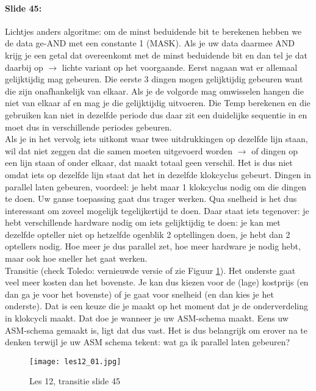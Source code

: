 \documentclass[10pt,a4paper]{book}
\begin{document}
\paragraph{Slide 45:} Lichtjes anders algoritme: om de minst beduidende bit te berekenen hebben we de data ge-AND met een constante 1 (MASK). Als je uw data daarmee AND krijg je een getal dat overeenkomt met de minst beduidende bit en dan tel je dat daarbij op $\rightarrow$ lichte variant op het voorgaande. Eerst nagaan wat er allemaal gelijktijdig mag gebeuren. Die eerste 3 dingen mogen gelijktijdig gebeuren want die zijn onafhankelijk van elkaar. Als je de volgorde mag omwisselen hangen die niet van elkaar af en mag je die gelijktijdig uitvoeren.  Die Temp berekenen en die gebruiken kan niet in dezelfde periode dus daar zit een duidelijke sequentie in en moet dus in verschillende periodes gebeuren.\\
Als je in het vervolg iets uitkomt waar twee uitdrukkingen op dezelfde lijn staan, wil dat niet zeggen dat die samen moeten uitgevoerd worden $\rightarrow$ of dingen op een lijn staan of onder elkaar, dat maakt totaal geen verschil. Het is dus niet omdat iets op dezelfde lijn staat dat het in dezelfde klokcyclus gebeurt. Dingen in parallel laten gebeuren, voordeel: je hebt maar 1 klokcyclus nodig om die dingen te doen. Uw ganse toepassing gaat dus trager werken. Qua snelheid is het dus interessant om zoveel mogelijk tegelijkertijd te doen. Daar staat iets tegenover: je hebt verschillende hardware nodig om iets gelijktijdig te doen: je kan met dezelfde opteller niet op hetzelfde ogenblik 2 optellingen doen, je hebt dan 2 optellers nodig. Hoe meer je dus parallel zet, hoe meer hardware je nodig hebt, maar ook hoe sneller het gaat werken.\\
Transitie (check Toledo: vernieuwde versie of zie Figuur \ref{les12_01}). Het onderste gaat veel meer kosten dan het bovenste. Je kan dus kiezen voor de (lage) kostprijs (en dan ga je voor het bovenste) of je gaat voor snelheid (en dan kies je het onderste). Dat is een keuze die je maakt op het moment dat je de onderverdeling in klokcycli maakt. Dat doe je wanneer je uw ASM-schema maakt. Eens uw ASM-schema gemaakt is, ligt dat dus vast. Het is dus belangrijk om erover na te denken terwijl je uw ASM schema tekent: wat ga ik parallel laten gebeuren?

\begin{figure}[ht!]
\centering
\texttt{[image: les12\_01.jpg]}
\caption{Les 12, transitie slide 45}
\label{les12_01}
\end{figure}
\end{document}
